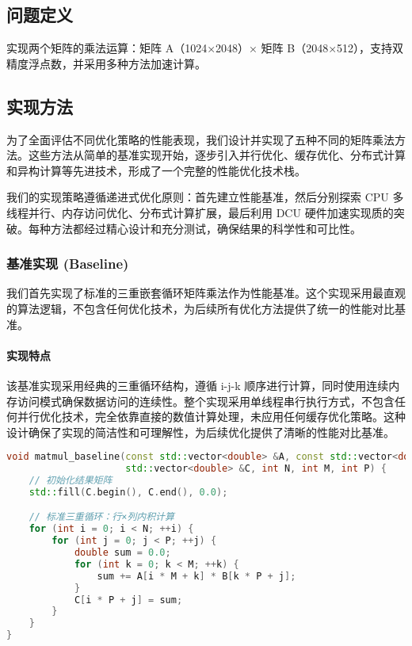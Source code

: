 \documentclass[a4paper]{article}
\begin{document}
\subsection{问题定义}

实现两个矩阵的乘法运算：矩阵 A（1024×2048）× 矩阵 B（2048×512），支持双精度浮点数，并采用多种方法加速计算。

\subsection{实现方法}

为了全面评估不同优化策略的性能表现，我们设计并实现了五种不同的矩阵乘法方法。这些方法从简单的基准实现开始，逐步引入并行优化、缓存优化、分布式计算和异构计算等先进技术，形成了一个完整的性能优化技术栈。

我们的实现策略遵循递进式优化原则：首先建立性能基准，然后分别探索 CPU 多线程并行、内存访问优化、分布式计算扩展，最后利用 DCU 硬件加速实现质的突破。每种方法都经过精心设计和充分测试，确保结果的科学性和可比性。

\subsubsection{基准实现 (Baseline)}

我们首先实现了标准的三重嵌套循环矩阵乘法作为性能基准。这个实现采用最直观的算法逻辑，不包含任何优化技术，为后续所有优化方法提供了统一的性能对比基准。

\paragraph{实现特点}

该基准实现采用经典的三重循环结构，遵循 i-j-k 顺序进行计算，同时使用连续内存访问模式确保数据访问的连续性。整个实现采用单线程串行执行方式，不包含任何并行优化技术，完全依靠直接的数值计算处理，未应用任何缓存优化策略。这种设计确保了实现的简洁性和可理解性，为后续优化提供了清晰的性能对比基准。

\begin{lstlisting}[language=C++]
void matmul_baseline(const std::vector<double> &A, const std::vector<double> &B,
                     std::vector<double> &C, int N, int M, int P) {
    // 初始化结果矩阵
    std::fill(C.begin(), C.end(), 0.0);

    // 标准三重循环：行×列内积计算
    for (int i = 0; i < N; ++i) {
        for (int j = 0; j < P; ++j) {
            double sum = 0.0;
            for (int k = 0; k < M; ++k) {
                sum += A[i * M + k] * B[k * P + j];
            }
            C[i * P + j] = sum;
        }
    }
}
\end{lstlisting}
\end{document}

